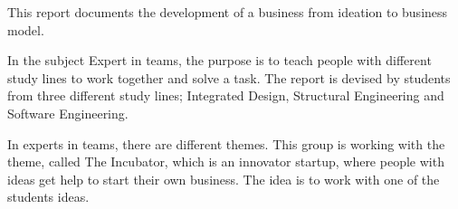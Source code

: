 This report documents the development of a business from ideation to business model.

In the subject Expert in teams, the purpose is to teach people with different study lines to work together and solve a task. The report is devised by students from three different study lines; Integrated Design, Structural Engineering and Software Engineering.

In experts in teams, there are different themes.
This group is working with the theme, called The Incubator, which is an innovator startup, where people with ideas get help to start their own business. The idea is to work with one of the students ideas.